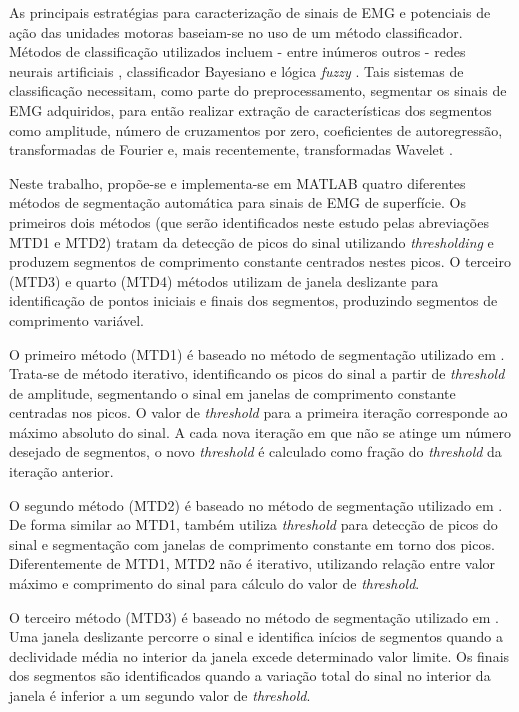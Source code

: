 As principais estratégias para caracterização de sinais de EMG e potenciais de ação das unidades motoras baseiam-se no uso de um método classificador. Métodos de classificação utilizados incluem - entre inúmeros outros - redes neurais artificiais \cite{Hudgins1993}, classificador Bayesiano \cite{Englehart2003} e lógica \emph{fuzzy} \cite{Chan2000}. Tais sistemas de classificação necessitam, como parte do preprocessamento, segmentar os sinais de EMG adquiridos, para então realizar extração de características dos segmentos como amplitude, número de cruzamentos por zero, coeficientes de autoregressão, transformadas de Fourier e, mais recentemente, transformadas Wavelet \cite{Jun-UkChu2007}. 

Neste trabalho, propõe-se e implementa-se em MATLAB quatro diferentes métodos de segmentação automática para sinais de EMG de superfície. Os primeiros dois métodos (que serão identificados neste estudo pelas abreviações MTD1 e MTD2) tratam da detecção de picos do sinal utilizando \emph{thresholding} e produzem segmentos de comprimento constante centrados nestes picos. O terceiro (MTD3) e quarto (MTD4) métodos utilizam de janela deslizante para identificação de pontos iniciais e finais dos segmentos, produzindo segmentos de comprimento variável.

O primeiro método (MTD1) é baseado no método de segmentação utilizado em \cite{Chauvet2001}. Trata-se de método iterativo, identificando os picos do sinal a partir de \emph{threshold} de amplitude, segmentando o sinal em janelas de comprimento constante centradas nos picos. O valor de \emph{threshold} para a primeira iteração corresponde ao máximo absoluto do sinal. A cada nova iteração em que não se atinge um número desejado de segmentos, o novo \emph{threshold} é calculado como fração do \emph{threshold} da iteração anterior.

O segundo método (MTD2) é baseado no método de segmentação utilizado em \cite{Katsis2006}. De forma similar ao MTD1, também utiliza \emph{threshold} para detecção de picos do sinal e segmentação com janelas de comprimento constante em torno dos picos. Diferentemente de MTD1, MTD2 não é iterativo, utilizando relação entre valor máximo e comprimento do sinal para cálculo do valor de \emph{threshold}.

O terceiro método (MTD3) é baseado no método de segmentação utilizado em \cite{Gut2000}. Uma janela deslizante percorre o sinal e identifica inícios de segmentos quando a declividade média no interior da janela excede determinado valor limite. Os finais dos segmentos são identificados quando a variação total do sinal no interior da janela é inferior a um segundo valor de \emph{threshold}.

